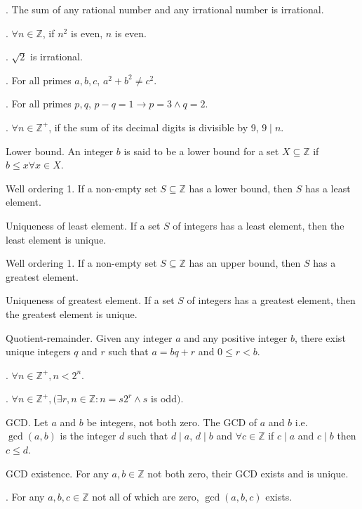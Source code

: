 \documentclass{slnotes}
\begin{document}
. The sum of any rational number and any irrational number is irrational.

. \(\forall n \in \mathbb{Z}\), if \(n^2\) is even, \(n\) is even.

. \(\sqrt{2}\) is irrational.

. For all primes \(a, b, c\), \(a^2 + b^2 \neq c^2\).

. For all primes \(p, q\), \(p - q = 1 \to p = 3 \land q = 2\).

. \(\forall n \in \mathbb{Z}^+\), if the sum of its decimal digits is divisible by 9, \(9 \mid n\).

 Lower bound. An integer \(b\) is said to be a lower bound for a set \(X \subseteq \mathbb{Z}\) if \(b \le x \forall x \in X\).

 Well ordering 1. If a non-empty set \(S \subseteq \mathbb{Z}\) has a lower bound, then \(S\) has a least element.

 Uniqueness of least element. If a set \(S\) of integers has a least element, then the least element is unique.

 Well ordering 1. If a non-empty set \(S \subseteq \mathbb{Z}\) has an upper bound, then \(S\) has a greatest element.

 Uniqueness of greatest element. If a set \(S\) of integers has a greatest element, then the greatest element is unique.

 Quotient-remainder. Given any integer \(a\) and any positive integer \(b\), there exist unique integers \(q\) and \(r\) such that \(a = bq + r\) and \(0 \le r < b\).

. \(\forall n \in \mathbb{Z}^+, n < 2^n\).

. \(\forall n \in \mathbb{Z}^+, (\exists r, n \in \mathbb{Z} : n = s2^r \land s\) is odd\()\).

 GCD. Let \(a\) and \(b\) be integers, not both zero. The GCD of \(a\) and \(b\) i.e. \(\gcd(a, b)\) is the integer \(d\) such that \(d \mid a\), \(d \mid b\) and \(\forall c \in \mathbb{Z}\) if \(c \mid a\) and \(c \mid b\) then \(c \le d\).

 GCD existence. For any \(a, b \in \mathbb{Z}\) not both zero, their GCD exists and is unique.

. For any \(a, b, c \in \mathbb{Z}\) not all of which are zero, \(\gcd(a, b, c)\) exists.
\end{document}
